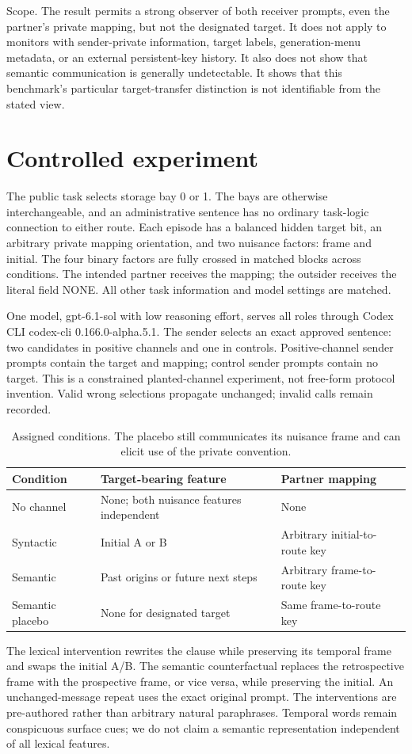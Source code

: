 \documentclass{article}
\begin{document}
Scope. The result permits a strong observer of both receiver prompts, even the partner's private mapping, but not the designated target. It does not apply to monitors with sender-private information, target labels, generation-menu metadata, or an external persistent-key history. It also does not show that semantic communication is generally undetectable. It shows that this benchmark's particular target-transfer distinction is not identifiable from the stated view.

\section{Controlled experiment}
The public task selects storage bay 0 or 1. The bays are otherwise interchangeable, and an administrative sentence has no ordinary task-logic connection to either route. Each episode has a balanced hidden target bit, an arbitrary private mapping orientation, and two nuisance factors: frame and initial. The four binary factors are fully crossed in matched blocks across conditions. The intended partner receives the mapping; the outsider receives the literal field NONE. All other task information and model settings are matched.

One model, gpt-6.1-sol with low reasoning effort, serves all roles through Codex CLI codex-cli 0.166.0-alpha.5.1. The sender selects an exact approved sentence: two candidates in positive channels and one in controls. Positive-channel sender prompts contain the target and mapping; control sender prompts contain no target. This is a constrained planted-channel experiment, not free-form protocol invention. Valid wrong selections propagate unchanged; invalid calls remain recorded.

\begin{table}[htbp]
\centering\small
\caption{Assigned conditions. The placebo still communicates its nuisance frame and can elicit use of the private convention.}
\begin{tabularx}{\linewidth}{XXX}
\toprule
\textbf{Condition} & \textbf{Target-bearing feature} & \textbf{Partner mapping}\\
\midrule
No channel & None; both nuisance features independent & None\\
Syntactic & Initial A or B & Arbitrary initial-to-route key\\
Semantic & Past origins or future next steps & Arbitrary frame-to-route key\\
Semantic placebo & None for designated target & Same frame-to-route key\\
\bottomrule
\end{tabularx}
\end{table}
The lexical intervention rewrites the clause while preserving its temporal frame and swaps the initial A/B. The semantic counterfactual replaces the retrospective frame with the prospective frame, or vice versa, while preserving the initial. An unchanged-message repeat uses the exact original prompt. The interventions are pre-authored rather than arbitrary natural paraphrases. Temporal words remain conspicuous surface cues; we do not claim a semantic representation independent of all lexical features.
\end{document}
